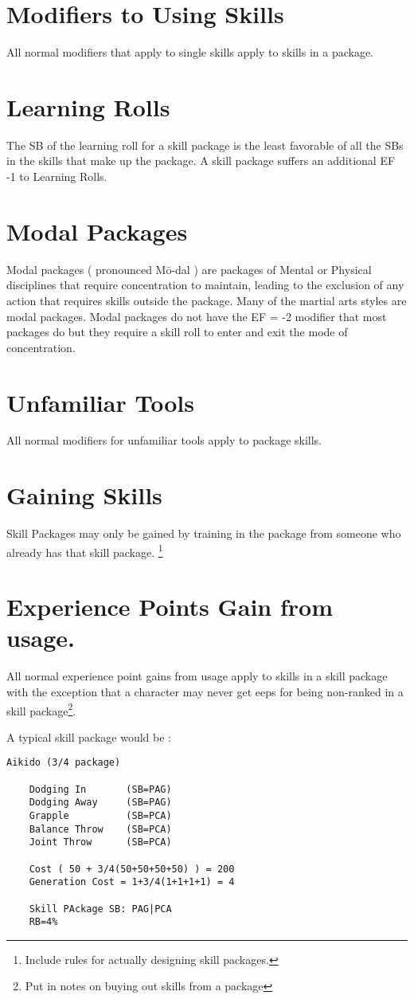 \section{Modifiers to Using Skills}
All normal modifiers that apply to single skills apply to skills in a package.

\section{Learning Rolls}
The SB of the learning roll for a skill package is the least favorable 
of all the SBs in the skills that make up the package. A skill package 
suffers an additional EF -1 to Learning Rolls.

\section{Modal Packages}

Modal packages ( pronounced M\=o-dal ) are packages of Mental or Physical disciplines 
that require concentration to maintain, leading to the exclusion of any action that
requires skills outside the package. Many of the martial arts styles are modal
packages.  Modal packages do not have the EF = -2 modifier that most packages do
but they require a skill roll to enter and exit the mode of concentration.

\section{Unfamiliar Tools}
All normal modifiers for unfamiliar tools apply to package skills.

\section{Gaining Skills}
Skill Packages may only be gained by training in the package from
someone who already has that skill package. \footnote{ Include rules for 
actually designing skill packages. }

\section{Experience Points Gain from usage.}

All normal experience point gains from usage apply to skills in a skill
package with the exception that a character may never get eeps for
being non-ranked in a skill package\footnote{Put in notes on buying 
out skills from a package}. 

A typical skill package would be :

\begin{verbatim}
Aikido (3/4 package)

	Dodging In       (SB=PAG)
	Dodging Away     (SB=PAG)
    Grapple	         (SB=PCA)
    Balance Throw    (SB=PCA)
    Joint Throw      (SB=PCA)

	Cost ( 50 + 3/4(50+50+50+50) ) = 200
    Generation Cost = 1+3/4(1+1+1+1) = 4

	Skill PAckage SB: PAG|PCA
	RB=4%

\end{verbatim}

